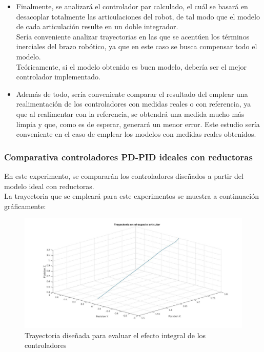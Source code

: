 \begin{itemize}
	\item Finalmente, se analizará el controlador par calculado, el cuál se basará en desacoplar totalmente las articulaciones del robot, de tal modo que el modelo de cada articulación resulte en un doble integrador.\\
	Sería conveniente analizar trayectorias en las que se acentúen los términos inerciales del brazo robótico, ya que en este caso se busca compensar todo el modelo.\\
	Teóricamente, si el modelo obtenido es buen modelo, debería ser el mejor controlador implementado.\\

	\item Además de todo, sería conveniente comparar el resultado del emplear una realimentación de los controladores con medidas reales o con referencia, ya que al realimentar con la referencia, se obtendrá una medida mucho más limpia y que, como es de esperar, generará un menor error. Este estudio sería conveniente en el caso de emplear los modelos con medidas reales obtenidos.\\

\end{itemize}


\subsubsection{Comparativa controladores PD-PID ideales con reductoras}

En este experimento, se compararán los controladores diseñados a partir del modelo ideal con reductoras. \\
La trayectoria que se empleará para este experimentos se muestra a continuación gráficamente:

\begin{figure}[h!]

	\centering

	\includegraphics[width=.8\textwidth]{exp1_tray}

	\caption{Trayectoria diseñada para evaluar el efecto integral de los controladores}

\end{figure}



